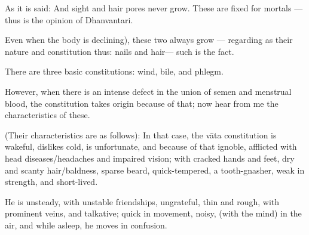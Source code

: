 \begin{translation}
\newpage
\begin{tt}
    \raggedright
    \bigskip
    
    
%

\item[60]

As it is said: And sight and hair pores  never  grow. These are fixed  for mortals — thus is  the opinion of Dhanvantari.

\item[61]

Even when the body  is declining), these two  always grow  — regarding as their nature and constitution thus: nails and hair— such is the fact.

\item[62]

There are three basic constitutions: wind, bile, and phlegm.

\item[63] 

However, when there is an intense defect in the union of semen and menstrual blood, the constitution  takes origin  because of that; now hear from me the characteristics of these.

\item[64]

(Their characteristics are as follows):
In that case, the vāta constitution is wakeful, dislikes cold, is unfortunate, and because of that ignoble, afflicted with head diseases/headaches and impaired vision; with cracked hands and feet, dry and scanty hair/baldness, sparse beard, quick-tempered, a tooth-gnasher, weak in strength, and short-lived.


\item[65]

He is unsteady, with unstable friendships, ungrateful, thin and rough, with prominent veins, and talkative; quick in movement, noisy, (with the mind) in the air, and while asleep, he moves  in confusion.

\item[66]


\end{tt}
\end{translation}
